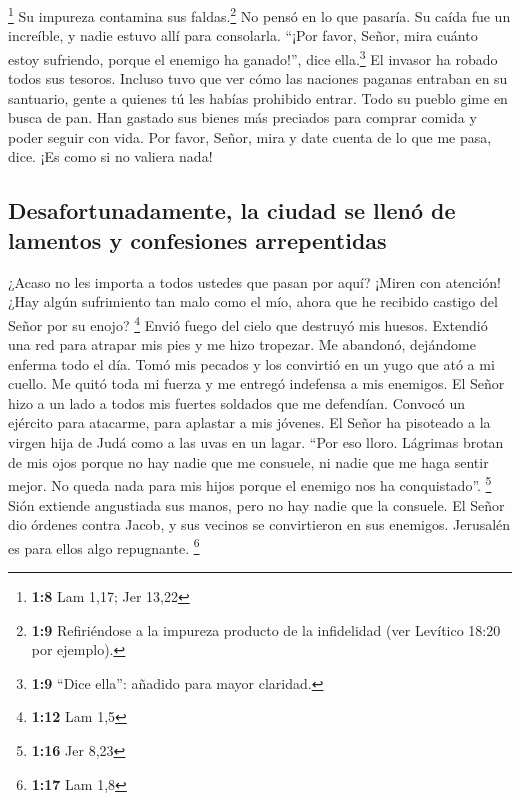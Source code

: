 \footnote{\textbf{1:8} Lam 1,17; Jer 13,22}  Su impureza
contamina sus faldas.\footnote{\textbf{1:9} Refiriéndose a la impureza
  producto de la infidelidad (ver Levítico 18:20 por ejemplo).} No pensó
en lo que pasaría. Su caída fue un increíble, y nadie estuvo allí para
consolarla. ``¡Por favor, Señor, mira cuánto estoy sufriendo, porque el
enemigo ha ganado!'', dice ella.\footnote{\textbf{1:9} ``Dice ella'':
  añadido para mayor claridad.}  El invasor ha robado
todos sus tesoros. Incluso tuvo que ver cómo las naciones paganas
entraban en su santuario, gente a quienes tú les habías prohibido
entrar.  Todo su pueblo gime en busca de pan. Han gastado
sus bienes más preciados para comprar comida y poder seguir con vida.
Por favor, Señor, mira y date cuenta de lo que me pasa, dice. ¡Es como
si no valiera nada!

\hypertarget{desafortunadamente-la-ciudad-se-llenuxf3-de-lamentos-y-confesiones-arrepentidas}{%
\subsection{Desafortunadamente, la ciudad se llenó de lamentos y
confesiones
arrepentidas}\label{desafortunadamente-la-ciudad-se-llenuxf3-de-lamentos-y-confesiones-arrepentidas}}

 ¿Acaso no les importa a todos ustedes que pasan por
aquí? ¡Miren con atención! ¿Hay algún sufrimiento tan malo como el mío,
ahora que he recibido castigo del Señor por su enojo? \footnote{\textbf{1:12}
  Lam 1,5}  Envió fuego del cielo que destruyó mis
huesos. Extendió una red para atrapar mis pies y me hizo tropezar. Me
abandonó, dejándome enferma todo el día.  Tomó mis
pecados y los convirtió en un yugo que ató a mi cuello. Me quitó toda mi
fuerza y me entregó indefensa a mis enemigos.  El Señor
hizo a un lado a todos mis fuertes soldados que me defendían. Convocó un
ejército para atacarme, para aplastar a mis jóvenes. El Señor ha
pisoteado a la virgen hija de Judá como a las uvas en un lagar.
 ``Por eso lloro. Lágrimas brotan de mis ojos porque no
hay nadie que me consuele, ni nadie que me haga sentir mejor. No queda
nada para mis hijos porque el enemigo nos ha conquistado''. \footnote{\textbf{1:16}
  Jer 8,23}  Sión extiende angustiada sus manos, pero no
hay nadie que la consuele. El Señor dio órdenes contra Jacob, y sus
vecinos se convirtieron en sus enemigos. Jerusalén es para ellos algo
repugnante. \footnote{\textbf{1:17} Lam 1,8}

